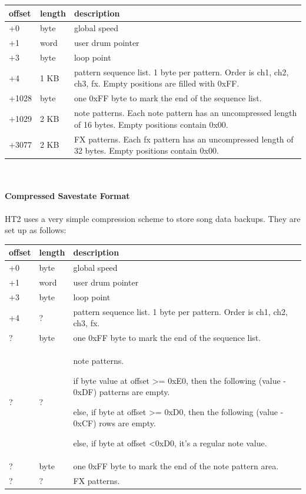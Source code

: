 \documentclass[12pt]{report}	%
\begin{document}
\begin{appendices}
\begin{tabularx}{\textwidth}{p{} p{} X}
\textbf{offset} & \textbf{length} & \textbf{description} \\
\hline
+0 & byte & global speed \\
+1 & word & user drum pointer \\
+3 & byte & loop point \\
+4 & 1 KB & pattern sequence list. 1 byte per pattern. Order is ch1, ch2, ch3, fx. Empty positions are filled with 0xFF. \\
+1028 & byte & one 0xFF byte to mark the end of the sequence list. \\
+1029 & 2 KB & note patterns. Each note pattern has an uncompressed length of 16 bytes. Empty positions contain 0x00. \\
+3077 & 2 KB & FX patterns. Each fx pattern has an uncompressed length of 32 bytes. Empty positions contain 0x00. \\
\end{tabularx} ~\\

\paragraph{Compressed Savestate Format} HT2 uses a very simple compression scheme to store song data backups. They are set up as follows:

\begin{tabularx}{\textwidth}{p{} p{} X}
\textbf{offset} & \textbf{length} & \textbf{description} \\
\hline
+0 & byte & global speed \\
+1 & word & user drum pointer \\
+3 & byte & loop point \\
+4 & ? & pattern sequence list. 1 byte per pattern. Order is ch1, ch2, ch3, fx. \\
? & byte & one 0xFF byte to mark the end of the sequence list. \\
? & ? & note patterns.

if byte value at offset \textgreater= 0xE0, then the following (value - 0xDF) patterns are empty.

else, if byte at offset \textgreater= 0xD0, then the following (value - 0xCF) rows are empty.

else, if byte at offset \textless\space0xD0, it's a regular note value. \\
? & byte & one 0xFF byte to mark the end of the note pattern area. \\
? & ? & FX patterns.


\end{tabularx}
\end{appendices}
\end{document}
